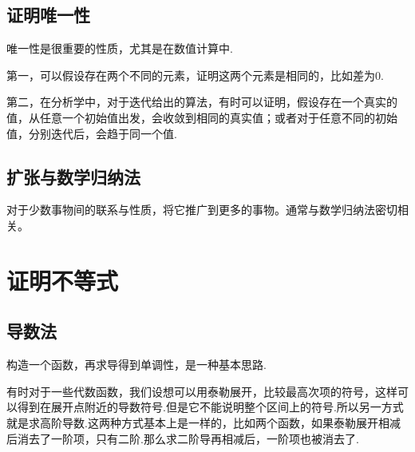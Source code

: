 \section{证明唯一性}
唯一性是很重要的性质，尤其是在数值计算中.

第一，可以假设存在两个不同的元素，证明这两个元素是相同的，比如差为0.

第二，在分析学中，对于迭代给出的算法，有时可以证明，假设存在一个真实的值，从任意一个初始值出发，会收敛到相同的真实值；或者对于任意不同的初始值，分别迭代后，会趋于同一个值.

\section{扩张与数学归纳法}
对于少数事物间的联系与性质，将它推广到更多的事物。通常与数学归纳法密切相关。

\chapter{证明不等式}
\section{导数法}
构造一个函数，再求导得到单调性，是一种基本思路.

有时对于一些代数函数，我们设想可以用泰勒展开，比较最高次项的符号，这样可以得到在展开点附近的导数符号.但是它不能说明整个区间上的符号.所以另一方式就是求高阶导数.这两种方式基本上是一样的，比如两个函数，如果泰勒展开相减后消去了一阶项，只有二阶.那么求二阶导再相减后，一阶项也被消去了.
